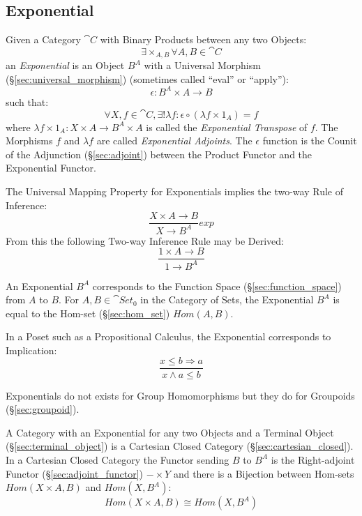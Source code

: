 \subsection{Exponential}\label{sec:category_exponential}

Given a Category $\cat{C}$ with Binary Products between any two
Objects:
\[
  \exists \times_{A,B} \forall A,B \in \cat{C}
\]
an \emph{Exponential} is an Object $B^A$ with a Universal Morphism
(\S\ref{sec:universal_morphism}) (sometimes called ``eval'' or
``apply''):
\[
  \epsilon : B^A \times A \rightarrow B
\]
such that:
\[
  \forall X, f \in \cat{C}, \exists ! \lambda f :
  \epsilon \circ (\lambda f \times 1_A) = f
\]
where $\lambda f \times 1_A : X \times A \rightarrow B^A \times A$ is
called the \emph{Exponential Transpose} of $f$. The Morphisms $f$ and
$\lambda f$ are called \emph{Exponential Adjoints}. The $\epsilon$
function is the Counit of the Adjunction (\S\ref{sec:adjoint}) between
the Product Functor and the Exponential Functor.

The Universal Mapping Property for Exponentials implies the two-way
Rule of Inference:
\[
  {
    \frac{X \times A \rightarrow B}
    {X \rightarrow B^A}
  }exp
\]
From this the following Two-way Inference Rule may be Derived:
\[
    \frac{1 \times A \rightarrow B}
    {1 \rightarrow B^A}
\]

An Exponential $B^A$ corresponds to the Function Space
(\S\ref{sec:function_space}) from $A$ to $B$. For $A,B \in
\cat{Set}_0$ in the Category of Sets, the Exponential $B^A$ is
equal to the Hom-set (\S\ref{sec:hom_set}) $Hom(A,B)$.

In a Poset such as a Propositional Calculus, the Exponential
corresponds to Implication:
\[
    \frac{x \leq b \Rightarrow a}
    {x \wedge a \leq b}
\]

Exponentials do not exists for Group Homomorphisms but they do for
Groupoids (\S\ref{sec:groupoid}).

A Category with an Exponential for any two Objects and a Terminal
Object (\S\ref{sec:terminal_object}) is a Cartesian Closed Category
(\S\ref{sec:cartesian_closed}). In a Cartesian Closed Category the
Functor sending $B$ to $B^A$ is the Right-adjoint Functor
(\S\ref{sec:adjoint_functor}) $- \times Y$ and there is a Bijection
between Hom-sets $Hom(X \times A, B)$ and $Hom(X, B^A)$:
\[
  Hom(X \times A, B) \cong Hom(X, B^A)
\]

